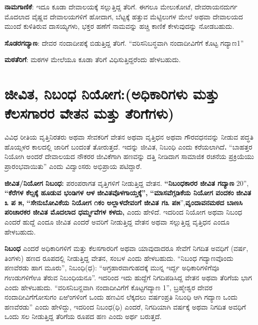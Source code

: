\textbf{ನಾಮಗಾಣಿಕೆ}: ಇದೂ ಕೂಡಾ ದೇವಾಲಯಕ್ಕೆ ಸಲ್ಲುತ್ತಿದ್ದ ತೆರಿಗೆ. ಈಗಲೂ ಮೇಲುಕೋಟೆ, ದೇವ\-ರಾಯನ\break ದುರ್ಗ ಮೊದಲಾದ ವೈಷ್ಣವ ದೇವಾಲಯಗಳಿಗೆ ಹೋದಾಗ, ಬೆಟ್ಟಕ್ಕೆ ಹತ್ತುವ ಮೆಟ್ಟಿಲುಗಳ ಮೇಲೆ ಅಥವಾ ದೇವಾಲಯದ ಮುಂದೆ ಕುಳಿತಿರುವ ದಾಸಯ್ಯಗಳು, ಭಕ್ತರ ಹಣೆಗೆ ನಾಮವನ್ನು ಹಚ್ಚಿ ಕಾಣಿಕೆ ಕೇಳುವುದನ್ನು ನೋಡಬಹುದು.

\textbf{ಸೊಡರಗದ್ಯಾಣ}: ದೇವರ ನಂದಾದೀಪಕ್ಕೆ ಬಿಡುತ್ತಿದ್ದ ತೆರಿಗೆ. “ವರಿಸನಿಬನ್ಧವಾಗಿ ನಂದಾದೀವಿಗೆಗೆ ಕೊಟ್ಟ ಗದ್ಯಾಣ1”

\textbf{ಮಠತೆರಿಗೆ}: ಮಠಗಳ ಮೇಲೆಯೂ ಕೂಡಾ ತೆರಿಗೆ ವಿಧಿಸುತ್ತಿದ್ದರೆಂದು ಹೇಳಬಹುದು.

\section*{ಜೀವಿತ, ನಿಬಂಧ ನಿಯೋಗ:(ಅಧಿಕಾರಿಗಳು ಮತ್ತು ಕೆಲಸಗಾರರ ವೇತನ ಮತ್ತು ತೆರಿಗೆಗಳು)}

ವಿವಿಧ ರೀತಿಯ ವೃತ್ತಿನಿರತರು ಅಥವಾ ಸೇವಕರಿಗೆ ವೇತನ ಅಥವಾ ವೃತ್ತಿಧನ ಅಥವಾ ಗೌರವಧನವನ್ನು ನೀಡುವ ಪದ್ಧತಿ ಹೊಯ್ಸಳರ ಕಾಲದಲ್ಲಿ ಜಾರಿಗೆ ಬಂದಂತೆ ತೋರುತ್ತದೆ. ಇದನ್ನು ಜೀವಿತ, ನಿಬಂಧಿ ಎಂದು ಕರೆಯಲಾಗಿದೆ\textbf{. }“ಬಾಹತ್ತರ ನಿಯೋಗಿ ಅಂದರೆ ದೇವಾಲಯದ ನೌಕರರ ಜೀವಿಕೆಗಾಗಿ ಹಣವನ್ನು ದತ್ತಿ ನೀಡಿದಾಗ ಸಾಮಾಜಿಕ ರಚನೆಯ ಪ್ರಕ್ರಿಯೆಯು ಪ್ರಾರಂಭವಾಯಿತು” ಎಂದು ವಿದ್ವಾಂಸರು ಅಭಿಪ್ರಾಯ ಪಟಿದ್ದಾರೆ.

\textbf{ಜೀವಿತ/ನಿಯೋಗ ನಿಬಂಧ:} ಪರಂಪರಾಗತ ವೃತ್ತಿಗಳಿಗೆ ನೀಡುತ್ತಿದ್ದ ವೇತನ. \textbf{“ನಿಬಂಧಕಾರರ ಜೀವಿತ ಗದ್ಯಾಣ} 20”,\textbf{ “ಕೆರೆಗಳ ಕೆಲ್ಸಕ್ಕೆ ಹೂಡುವ ಭಂಡಿಗಳ ಆಳ ಜೀವಿತವೊಳಗಾಯ್ತಕ್ಕೆ”,}\textbf{ “ಮಾಸವೆಗ್ಗಡಿಕೆಯ ನಿಯೋಗ ವಂದಕಂ} \textbf{ಜೀವಿತ ೩ ಪ ೫,}\textbf{ “ಸೇನುಬೋವಿಕೆಯ ನಿಯೋಗ ೧ಕಂ ಅಲ್ಲಾಳದೇವಂಗೆ ಜೀವಿತ ಗ೩ ಪ೫}”,\textbf{ವೃಂದಾವನಮಠದ ಬಾಣಸಿ ಪರಿಚಾರಕರ ಜೀವಿತ ಮೊದಲಾದ ಧರ್ಮ್ಮವೆಗಳ ಕಳದು,} ಎಂದು ಹೇಳಿದೆ. ಇದರಿಂದ ನಿಯೋಗ ಅಥವಾ ನಿಬಂಧ ಎಂದರೆ ಹುದ್ದೆ ಎಂದೂ ಜೀವಿತ ಎಂದರೆ ಅವರಿಗೆ ನೀಡುತ್ತಿದ್ದ ವೇತನ ಅಥವಾ ಸಲ್ಲುತ್ತಿದ್ದ ವೃತ್ತಿಧನ ಎಂದೂ ಹೇಳಬಹುದು.

\newpage

\textbf{ನಿಬಂಧ} ಎಂದರೆ ಅಧಿಕಾರಿಗಳಿಗೆ ಮತ್ತು ಕೆಲಸಗಾರರಿಗೆ ಅಥವಾ ಯಾವುದಾದರೂ ಸೇವೆಗೆ ನಿಗದಿತ ಅವಧಿಗೆ (ವರ್ಷ, ತಿಂಗಳು) ಹಣದ ರೂಪದಲ್ಲಿ ನೀಡುತ್ತಿದ್ದ ವೇತನ, ಸಂಬಳ ಎಂದು ಹೇಳಬಹುದು. “ನಿಬಂಧ ಗದ್ಯಾಣವೊಂದು ಪಣವೆರಡು ಹಾಗ ಮೂರು”, ನಿಬಂಧಿ(ಧ): “ಅಗ್ರಹಾರವಾಗುಹದಕ್ಕೆ ಮುನ್ನ ಇರ್ದ್ದ ಅಧಿಕಾರಿಗಳಿಗೆವೂ ಗಉಡುಗಳಿಗೆಊ ತೆರುವ ನಿಬಂಧಿಯನೂ”. ಇದರಿಂದ ಇದು ಹುದ್ದೆಗೆ ನಿಗದಿಪಡಿಸಿದ್ದ ವೇತನ ಅಥವಾ ತೆರಿಗೆಯ ಭಾಗ ಎಂದು ಹೇಳಬಹುದು. “ವರಿಸನಿಬನ್ದವಾಗಿ ನಂದಾದೀವಿಗೆಗೆ ಕೊಟ್ಟಗದ್ಯಾಣ 1”, ಬ್ರಹ್ಮೇಶ್ವರ ದೇವರ ನಂದಾದೀವಿಗೆಗೋಸುಗಂ ಏಱಿಂಗಳಿಂಗೆ ಒಂದು ಹಣವಿನ ಲೆಕ್ಕದಲು ವರ್ಷಂಪ್ರತಿ ನಿಬಂಧಿ ಆಗಿ ಗದ್ಯಾಣ ಒಂದು ಹಣವೆರಡು” ಎಂದು ಹೇಳಿದ್ದು, ಇದರಿಂದ ನಿಬಂಧ(ಧಿ) ಎಂದರೆ, ನಿಗದಿಯಾಗಿ ವರ್ಷಕ್ಕೆ ಅಥವಾ ನಿಗದಿತ ಅವಧಿಗೆ ಒಂದು ಸಲ ನೀಡುತ್ತಿದ್ದ ತೆರಿಗೆಯ ರೂಪದ ಹಣ ಎಂದು ಅರ್ಥ ಬರುತ್ತದೆ.


